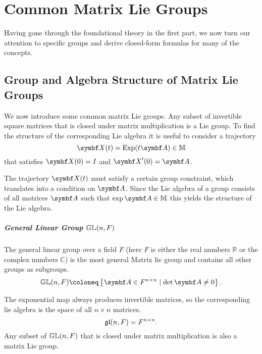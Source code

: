 \chapter{Common Matrix Lie Groups}

Having gone through the foundational theory in the first part, we now turn our attention to specific groups and derive closed-form formulas for many of the concepts.



\section{Group and Algebra Structure of Matrix Lie Groups}

We now introduce some common matrix Lie groups. Any subset of invertible square matrices that is closed under matrix multiplication is a Lie group. To find the structure of the corresponding Lie algebra it is useful to consider a trajectory
\begin{equation}
  \label{eq:4}
  \X(t) = \Exp(t \A) \in \M
\end{equation}
that satisfies $\X(0) = I$ and $\X'(0) = \A$.

The trajectory $\X(t)$ must satisfy a certain group constraint, which translates into a condition on $\A$. Since the Lie algebra of a group consists of all matrices $\A$ such that $\exp \A \in \M$ this yields the structure of the Lie algebra.


\paragraph{General Linear Group ${\mathbb{GL}}(n, F)$}

The general linear group over a field $F$ (here $F$ is either the real numbers $\mathbb{R}$ or the complex numbers $\mathbb{C}$) is the most general Matrix lie group and contains all other groups as subgroups.
\begin{equation}
  \GL(n, F) \coloneq \left\{ \A \in F^{{n \times n}} \mid \det \A \neq 0 \right\}.
\end{equation}

The exponential map always produces invertible matrices, so the corresponding lie algebra is the space of all $n \times n$ matrices.
\begin{equation}
  \mathfrak{gl}(n, F) = F^{n \times n}.
\end{equation}
Any subset of ${\mathbb{GL}}(n, F)$ that is closed under matrix multiplication is also a matrix Lie group.


